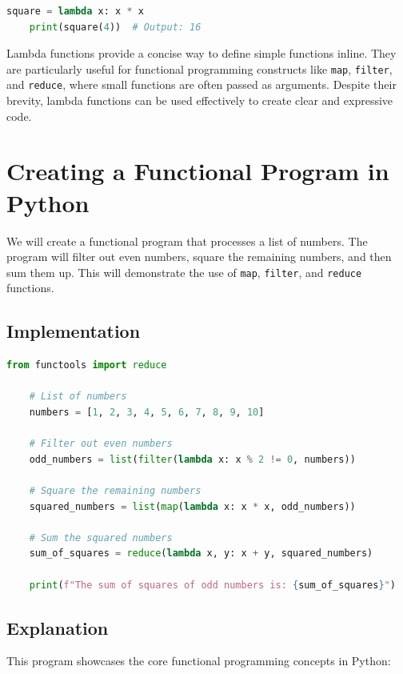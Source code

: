 \documentclass[a4paper]{article}
\begin{document}
\begin{lstlisting}[language=Python, caption=Anonymous Functions (Lambdas)]
    square = lambda x: x * x
    print(square(4))  # Output: 16
\end{lstlisting}

Lambda functions provide a concise way to define simple functions inline. They are particularly useful for functional programming constructs like \texttt{map}, \texttt{filter}, and \texttt{reduce}, where small functions are often passed as arguments. Despite their brevity, lambda functions can be used effectively to create clear and expressive code.\\

\section{Creating a Functional Program in Python}
We will create a functional program that processes a list of numbers. The program will filter out even numbers, square the remaining numbers, and then sum them up. This will demonstrate the use of \texttt{map}, \texttt{filter}, and \texttt{reduce} functions.\\

\subsection{Implementation}

\begin{lstlisting}[language=Python, caption=Functional Program Demo]
    from functools import reduce

    # List of numbers
    numbers = [1, 2, 3, 4, 5, 6, 7, 8, 9, 10]

    # Filter out even numbers
    odd_numbers = list(filter(lambda x: x % 2 != 0, numbers))

    # Square the remaining numbers
    squared_numbers = list(map(lambda x: x * x, odd_numbers))

    # Sum the squared numbers
    sum_of_squares = reduce(lambda x, y: x + y, squared_numbers)

    print(f"The sum of squares of odd numbers is: {sum_of_squares}")
\end{lstlisting}

\subsection{Explanation}
This program showcases the core functional programming concepts in Python:
\end{document}
